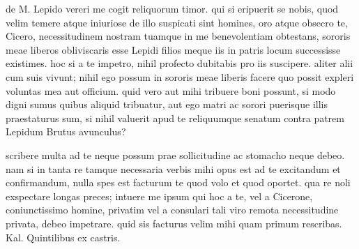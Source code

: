 


 de M. Lepido vereri me cogit reliquorum timor. qui si eripuerit se nobis, quod velim temere atque iniuriose de illo suspicati sint homines, oro atque obsecro te, Cicero, necessitudinem nostram tuamque in me benevolentiam obtestans, sororis meae liberos obliviscaris esse Lepidi filios meque iis in patris locum successisse existimes. hoc si a te impetro, nihil profecto dubitabis pro iis suscipere. aliter alii cum suis vivunt; nihil ego possum in sororis meae liberis facere quo possit expleri voluntas mea aut officium. quid vero aut mihi tribuere boni possunt, si modo digni sumus quibus aliquid tribuatur, aut ego matri ac sorori puerisque illis praestaturus sum, si nihil valuerit apud te reliquumque senatum contra patrem Lepidum Brutus avunculus?

 scribere multa ad te neque possum prae sollicitudine ac stomacho neque debeo. nam si in tanta re tamque necessaria verbis mihi opus est ad te excitandum et confirmandum, nulla spes est facturum te quod volo et quod oportet. qua re noli exspectare longas preces; intuere me ipsum qui hoc a te, vel a Cicerone, coniunctissimo homine, privatim vel a consulari tali viro remota necessitudine privata, debeo impetrare. quid sis facturus velim mihi quam primum rescribas. Kal. Quintilibus ex castris.

